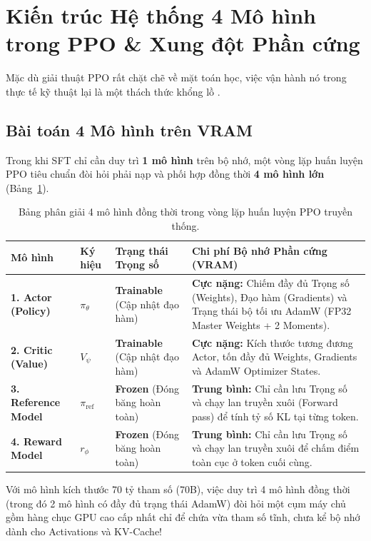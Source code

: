\section{Kiến trúc Hệ thống 4 Mô hình trong PPO \& Xung đột Phần cứng}
\label{sec:ppo_system_hardware}

Mặc dù giải thuật PPO rất chặt chẽ về mặt toán học, việc vận hành nó trong thực tế kỹ thuật lại là một thách thức khổng lồ \citep{sheng2024hybridflow}.

\subsection{Bài toán 4 Mô hình trên VRAM}
Trong khi SFT chỉ cần duy trì \textbf{1 mô hình} trên bộ nhớ, một vòng lặp huấn luyện PPO tiêu chuẩn đòi hỏi phải nạp và phối hợp đồng thời \textbf{4 mô hình lớn} (Bảng~\ref{tab:ppo_4_models}).

\begin{table}[h!]
\centering
\small
\renewcommand{\arraystretch}{1.35}
\begin{tabularx}{\textwidth}{>{\bfseries}p{3cm} >{\bfseries}p{1.5cm} p{4.2cm} X}
\toprule
Mô hình & Ký hiệu & Trạng thái Trọng số & Chi phí Bộ nhớ Phần cứng (VRAM) \\
\midrule
1. Actor (Policy) & $\pi_\theta$ & \textbf{Trainable} (Cập nhật đạo hàm) & \textbf{Cực nặng:} Chiếm đầy đủ Trọng số (Weights), Đạo hàm (Gradients) và Trạng thái bộ tối ưu AdamW (FP32 Master Weights + 2 Moments). \\
2. Critic (Value) & $V_\psi$ & \textbf{Trainable} (Cập nhật đạo hàm) & \textbf{Cực nặng:} Kích thước tương đương Actor, tốn đầy đủ Weights, Gradients và AdamW Optimizer States. \\
3. Reference Model & $\pi_{\text{ref}}$ & \textbf{Frozen} (Đóng băng hoàn toàn) & \textbf{Trung bình:} Chỉ cần lưu Trọng số và chạy lan truyền xuôi (Forward pass) để tính tỷ số KL tại từng token. \\
4. Reward Model & $r_\phi$ & \textbf{Frozen} (Đóng băng hoàn toàn) & \textbf{Trung bình:} Chỉ cần lưu Trọng số và chạy lan truyền xuôi để chấm điểm toàn cục ở token cuối cùng. \\
\bottomrule
\end{tabularx}
\caption{Bảng phân giải 4 mô hình đồng thời trong vòng lặp huấn luyện PPO truyền thống.}
\label{tab:ppo_4_models}
\end{table}

Với mô hình kích thước 70 tỷ tham số (70B), việc duy trì 4 mô hình đồng thời (trong đó 2 mô hình có đầy đủ trạng thái AdamW) đòi hỏi một cụm máy chủ gồm hàng chục GPU cao cấp nhất chỉ để chứa vừa tham số tĩnh, chưa kể bộ nhớ dành cho Activations và KV-Cache!

